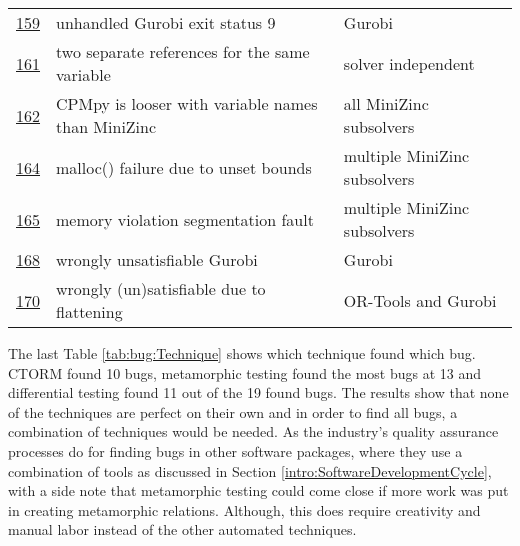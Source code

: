 \begin{table}[]
\begin{tabular}{lll}
		\href{https://github.com/CPMpy/cpmpy/issues/159}{159} & unhandled Gurobi exit status 9                    & Gurobi                       \\
		\href{https://github.com/CPMpy/cpmpy/issues/161}{161} & two separate references for the same variable     & solver independent           \\
		\href{https://github.com/CPMpy/cpmpy/issues/162}{162} & CPMpy is looser with variable names than MiniZinc & all MiniZinc subsolvers      \\
		\href{https://github.com/CPMpy/cpmpy/issues/164}{164} & malloc() failure due to unset bounds              & multiple MiniZinc subsolvers \\
		\href{https://github.com/CPMpy/cpmpy/issues/165}{165} & memory violation segmentation fault               & multiple MiniZinc subsolvers \\
		\href{https://github.com/CPMpy/cpmpy/issues/168}{168} & wrongly unsatisfiable Gurobi                      & Gurobi                       \\
		\href{https://github.com/CPMpy/cpmpy/issues/170}{170} & wrongly (un)satisfiable due to flattening         & OR-Tools and Gurobi          \\ \bottomrule
	\end{tabular}
\end{table}

\label{res:TechniqueToFindBug}
The last Table \ref{tab:bug:Technique} shows which technique found which bug. CTORM found 10 bugs, metamorphic testing found the most bugs at 13 and differential testing found 11 out of the 19 found bugs. The results show that none of the techniques are perfect on their own and in order to find all bugs, a combination of techniques would be needed. As the industry’s quality assurance processes do for finding bugs in other software packages, where they use a combination of tools as discussed in Section \ref{intro:SoftwareDevelopmentCycle}, with a side note that metamorphic testing could come close if more work was put in creating metamorphic relations. Although, this does require creativity and manual labor instead of the other automated techniques.

